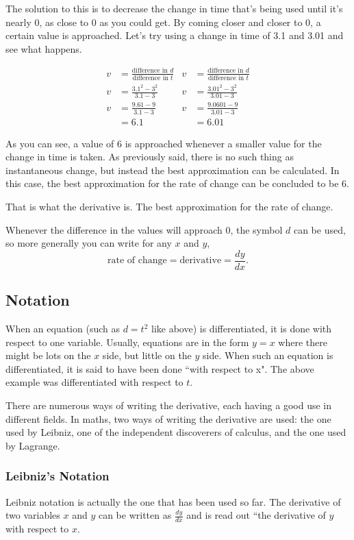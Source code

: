 The solution to this is to decrease the change in time that's being used until it's nearly $0$, as close to $0$ as you could get. By coming closer and closer to 0, a certain value is approached. Let's try using a change in time of 3.1 and 3.01 and see what happens.

\begin{align*}
	v&=\frac{\text{difference in $d$}}{\text{difference in $t$}} & v&=\frac{\text{difference in $d$}}{\text{difference in $t$}}\\[0.75em]
	v &= \frac{3.1^2 - 3^2}{3.1-3} & v &= \frac{3.01^2 - 3^2}{3.01-3}\\[0.75em]
	v &= \frac{9.61-9}{3.1-3} & v &= \frac{9.0601-9}{3.01-3}\\
	&= 6.1 & &= 6.01
\end{align*}

As you can see, a value of $6$ is approached whenever a smaller value for the change in time is taken. As previously said, there is no such thing as instantaneous change, but instead the best approximation can be calculated. In this case, the best approximation for the rate of change can be concluded to be $6$.

That is what the derivative is. The best approximation for the rate of change.

Whenever the difference in the values will approach $0$, the symbol $d$ can be used, so more generally you can write for any $x$ and $y$,
\begin{equation}
	\text{rate of change} = \text{derivative} = \frac{dy}{dx}\text{.}
\end{equation}

\subsection{Notation}
When an equation (such as $d=t^2$ like above) is differentiated, it is done with respect to one variable. Usually, equations are in the form $y=x$ where there might be lots on the $x$ side, but little on the $y$ side. When such an equation is differentiated, it is said to have been done ``with respect to x". The above example was differentiated with respect to $t$.

There are numerous ways of writing the derivative, each having a good use in different fields. In maths, two ways of writing the derivative are used: the one used by Leibniz, one of the independent discoverers of calculus, and the one used by Lagrange.

\subsubsection{Leibniz's Notation}
Leibniz notation is actually the one that has been used so far. The derivative of two variables $x$ and $y$ can be written as $\frac{dy}{dx}$ and is read out ``the derivative of $y$ with respect to $x$.
